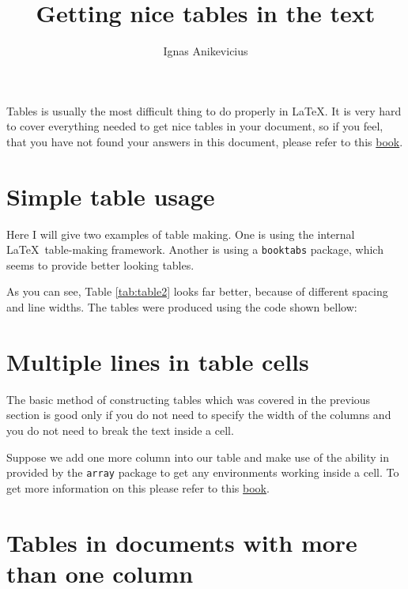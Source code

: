 \documentclass[a4paper,11pt]{article}
\title{Getting nice tables in the text}
\author{Ignas Anikevicius}
\begin{document}
\maketitle

Tables is usually the most difficult thing to do properly in \LaTeX . It is very
hard to cover everything needed to get nice tables in your document, so if you
feel, that you have not found your answers in this document, please refer to
this 
\href{https://secure.wikimedia.org/wikibooks/en/wiki/LaTeX/Tables#The_table_environment_-_captioning_etc}{book}.

\section{Simple table usage}

Here I will give two examples of table making. One is using the internal \LaTeX\
table-making framework. Another is using a \verb|booktabs| package, which seems
to provide better looking tables.




As you can see, Table \ref{tab:table2} looks far better, because of different
spacing and line widths. The tables were produced using the code shown bellow:



\section{Multiple lines in table cells}

The basic method of constructing tables which was covered in the previous
section is good only if you do not need to specify the width of the columns and
you do not need to break the text inside a cell.

Suppose we add one more column into our table and make use of the ability in
provided by the \verb|array| package to get any environments working inside a
cell. To get more information on this please refer to this 
\href{https://secure.wikimedia.org/wikibooks/en/wiki/LaTeX/Tables#The_table_environment_-_captioning_etc}{book}.




\section{Tables in documents with more than one column}
\end{document}
